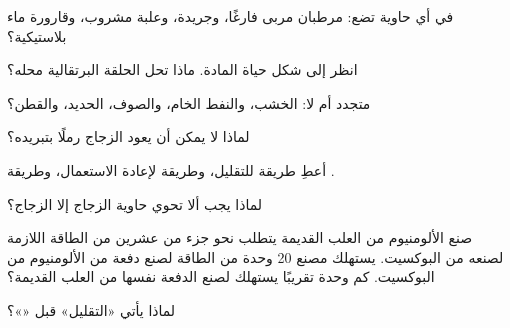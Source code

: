\begin{exercise}[$\star$]\label{exo:g5:raw-materials-and-recycling:4}
في أي حاوية تضع: مرطبان مربى فارغًا، وجريدة، وعلبة مشروب، وقارورة ماء
بلاستيكية؟
\end{exercise}

\begin{exercise}[$\star$]\label{exo:g5:raw-materials-and-recycling:5}
انظر إلى شكل حياة المادة. ماذا تحل الحلقة البرتقالية
محله؟
\end{exercise}

\begin{exercise}[$\star$]\label{exo:g5:raw-materials-and-recycling:6}
متجدد أم لا: الخشب، والنفط الخام، والصوف،  الحديد، والقطن؟
\end{exercise}

\begin{exercise}[$\star$]\label{exo:g5:raw-materials-and-recycling:7}
لماذا لا يمكن أن يعود الزجاج رملًا بتبريده؟
\end{exercise}

\begin{exercise}[$\star$]\label{exo:g5:raw-materials-and-recycling:8}
أعطِ طريقة للتقليل، وطريقة لإعادة الاستعمال، وطريقة .
\end{exercise}

\begin{exercise}[$\star$]\label{exo:g5:raw-materials-and-recycling:9}
لماذا يجب ألا تحوي حاوية الزجاج إلا الزجاج؟
\end{exercise}

\begin{exercise}[$\star\star$]\label{exo:g5:raw-materials-and-recycling:10}
صنع الألومنيوم من العلب القديمة يتطلب نحو جزء من عشرين من الطاقة اللازمة
لصنعه من البوكسيت. يستهلك مصنع 20 وحدة من الطاقة لصنع دفعة من
الألومنيوم من البوكسيت. كم وحدة تقريبًا يستهلك لصنع الدفعة نفسها من
العلب القديمة؟
\end{exercise}

\begin{exercise}[$\star\star$]\label{exo:g5:raw-materials-and-recycling:11}
لماذا يأتي «التقليل» قبل «»؟
\end{exercise}
